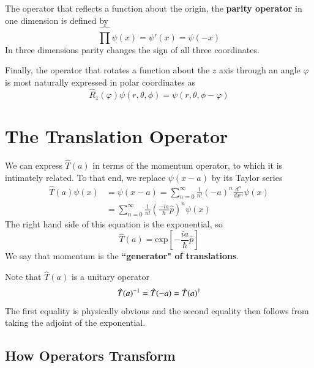\documentclass[12pt, a4paper, oneside, openright, titlepage]{book}
\begin{document}
The operator that reflects a function about the origin, the \textbf{parity operator} in one dimension is defined by \begin{equation*}
    \hat{\prod}\psi(x) = \psi'(x) = \psi(-x)
\end{equation*}
In three dimensions parity changes the sign of all three coordinates.

Finally, the operator that rotates a function about the $z$ axis through an angle $\varphi$ is most naturally expressed in polar coordinates as \begin{equation*}
    \hat{R}_z(\varphi)\psi(r,\theta,\phi) = \psi(r,\theta,\phi-\varphi)
\end{equation*}


\section{The Translation Operator}

We can express $\hat{T}(a)$ in terms of the momentum operator, to which it is intimately related. To that end, we replace $\psi(x-a)$ by its Taylor series \begin{align*}
    \hat{T}(a)\psi(x) &= \psi(x-a) = \sum_{n=0}^{\infty}\frac{1}{n!}(-a)^n\frac{d^n}{dx^n}\psi(x)  \\
    &= \sum_{n=0}^{\infty}\frac{1}{n!}\left(\frac{-ia}{\hbar}\hat{p}\right)^n\psi(x)
\end{align*}
The right hand side of this equation is the exponential, so \begin{equation*}
    \hat{T}(a)=\text{exp}\left[-\frac{ia}{\hbar}\hat{p}\right]
\end{equation*}
We say that momentum is the \textbf{``generator" of translations}.

Note that $\hat{T}(a)$ is a unitary operator \begin{equation*}
    \hat{T}(a)^{-1} = \hat{T}(-a) = \hat{T}(a)^{\text{\textdagger}}
\end{equation*}
The first equality is physically obvious and the second equality then follows from taking the adjoint of the exponential.

\subsection{How Operators Transform}
\end{document}
